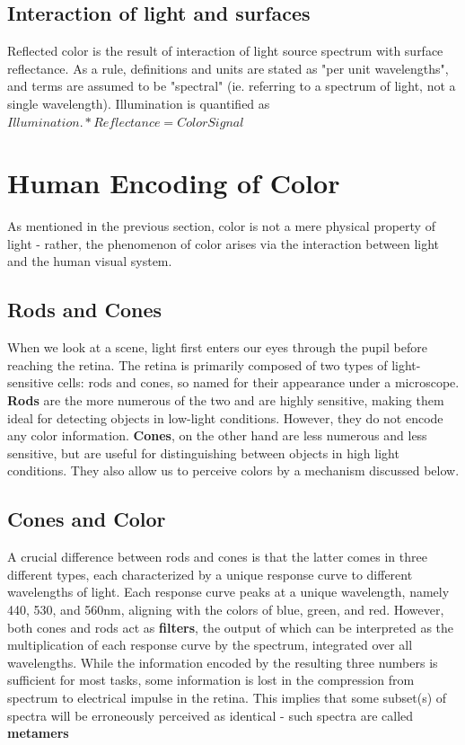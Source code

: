 \documentclass{article}
\begin{document}
\subsection{Interaction of light and surfaces}
Reflected color is the result of interaction of light source spectrum with surface reflectance.  As a rule, definitions and units are stated as "per unit wavelengths", and terms are assumed to be "spectral" (ie. referring to a spectrum of light, not a single wavelength).  Illumination is quantified as $Illumination .* Reflectance = Color Signal$ ~\cite{wandell1995foundations}

\section{Human Encoding of Color}
As mentioned in the previous section, color is not a mere physical property of light - rather, the phenomenon of color arises via the interaction between light and the human visual system. 
\subsection{Rods and Cones}
When we look at a scene, light first enters our eyes through the pupil before reaching the retina. The retina is primarily composed of two types of light-sensitive cells: rods and cones, so named for their appearance under a microscope. \textbf{Rods} are the more numerous of the two and are highly sensitive, making them ideal for detecting objects in low-light conditions. However, they do not encode any color information. \textbf{Cones}, on the other hand are less numerous and less sensitive, but are useful for distinguishing between objects in high light conditions. They also allow us to perceive colors by a mechanism discussed below.

\subsection{Cones and Color}
A crucial difference between rods and cones is that the latter comes in three different types, each characterized by a unique response curve to different wavelengths of light. Each response curve peaks at a unique wavelength, namely 440, 530, and 560nm, aligning with the colors of blue, green, and red. However, both cones and rods act as \textbf{filters}, the output of which can be interpreted as the multiplication of each response curve by the spectrum, integrated over all wavelengths. While the information encoded by the resulting three numbers is sufficient for most tasks, some information is lost in the compression from spectrum to electrical impulse in the retina. This implies that some subset(s) of spectra will be erroneously perceived as identical - such spectra are called \textbf{metamers}
\end{document}
